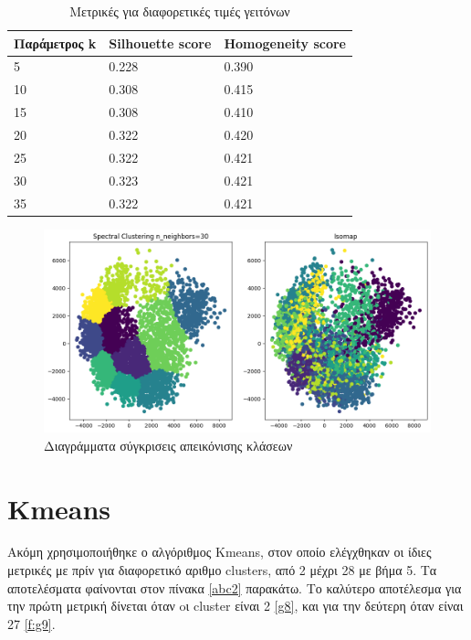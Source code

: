 \begin{table}[ht]
	\centering
	\caption{Μετρικές για διαφορετικές τιμές γειτόνων}
	\begin{tabular}{l | l | l}
		Παράμετρος k & Silhouette score &  Homogeneity score\\
		\hline
		5 & 0.228 & 0.390\\
		10 & 0.308 & 0.415\\
		15 & 0.308&0.410\\
		20 & 0.322 & 0.420\\
		25 &0.322 & 0.421\\
		30 & 0.323 & 0.421\\
		35 & 0.322 & 0.421\\
	\end{tabular}
	
	\label{tab:abc3}
\end{table}
\begin{figure}[ht]
	\centering
	\includegraphics[width=1\linewidth]{Imagedata1/n_30isomap.png}
	\caption{ Διαγράμματα σύγκρισεις απεικόνισης κλάσεων }
	\label{f:g7}	
\end{figure}

\section{Kmeans}
Ακόμη χρησιμοποιήθηκε ο αλγόριθμος Kmeans, στον οποίο ελέγχθηκαν οι ίδιες μετρικές με πρίν για διαφορετικό αριθμο clusters, από 2 μέχρι 28 με βήμα 5. Τα αποτελέσματα φαίνονται στον πίνακα \ref{abc2} παρακάτω. Το καλύτερο αποτέλεσμα για την πρώτη μετρική δίνεται όταν oι cluster είναι 2 \ref{g8}, και για την δεύτερη όταν είναι 27 \ref{f:g9}.

